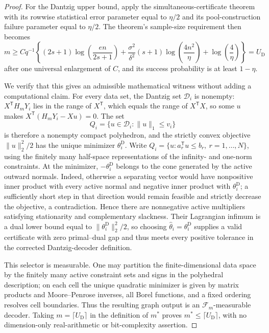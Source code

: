 \documentclass{article}
\begin{document}
\begin{proof}
For the Dantzig upper bound, apply the simultaneous-certificate theorem with its rowwise statistical error parameter equal to \(\eta/2\) and its pool-construction failure parameter equal to \(\eta/2\).  The theorem's sample-size requirement then becomes
\[
 m\ge Cq^{-1}\left\{(2s+1)\log\!\left(\frac{en}{2s+1}\right)
 +\frac{\sigma^2}{\delta^2}(s+1)\log\!\left(\frac{4n^2}{\eta}\right)
 +\log\!\left(\frac4\eta\right)\right\}=U_{\mathrm D} \tag{36}
\]
after one universal enlargement of \(C\), and its success probability is at least \(1-\eta\).

We verify that this gives an admissible mathematical witness without adding a computational claim.  For every data set, the Dantzig set \(\mathcal D_i\) is nonempty: \(X^{\mathsf T}H_mY_i\) lies in the range of \(X^{\mathsf T}\), which equals the range of \(X^{\mathsf T}X\), so some \(u\) makes \(X^{\mathsf T}(H_mY_i-Xu)=0\).  The set
\[
 Q_i=\{u\in\mathcal D_i:\lVert u\rVert_1\le v_i\}
\]
is therefore a nonempty compact polyhedron, and the strictly convex objective \(\lVert u\rVert_2^2/2\) has the unique minimizer \(\theta_i^{\mathrm D}\).  Write \(Q_i=\{u:a_r^{\mathsf T}u\le b_r,\ r=1,\ldots,N\}\), using the finitely many half-space representations of the infinity- and one-norm constraints.  At the minimizer, \(-\theta_i^{\mathrm D}\) belongs to the cone generated by the active outward normals.  Indeed, otherwise a separating vector would have nonpositive inner product with every active normal and negative inner product with \(\theta_i^{\mathrm D}\); a sufficiently short step in that direction would remain feasible and strictly decrease the objective, a contradiction.  Hence there are nonnegative active multipliers satisfying stationarity and complementary slackness.  Their Lagrangian infimum is a dual lower bound equal to \(\lVert\theta_i^{\mathrm D}\rVert_2^2/2\), so choosing \(\widehat\theta_i=\theta_i^{\mathrm D}\) supplies a valid certificate with zero primal--dual gap and thus meets every positive tolerance in the corrected Dantzig-decoder definition.

This selector is measurable.  One may partition the finite-dimensional data space by the finitely many active constraint sets and signs in the polyhedral description; on each cell the unique quadratic minimizer is given by matrix products and Moore--Penrose inverses, all Borel functions, and a fixed ordering resolves cell boundaries.  Thus the resulting graph output is an \(\mathcal F_m\)-measurable decoder.  Taking \(m=\lceil U_{\mathrm D}\rceil\) in the definition of \(m^*\) proves \(m^*\le\lceil U_{\mathrm D}\rceil\), with no dimension-only real-arithmetic or bit-complexity assertion.


\end{proof}
\end{document}

